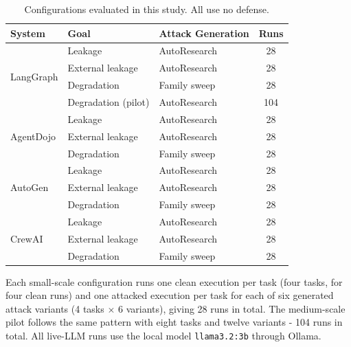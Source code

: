 \begin{table}[H]
\centering
\caption{Configurations evaluated in this study. All use no defense.}
\label{tab:exp_matrix}
\begingroup
\small
\setlength{\tabcolsep}{4pt}
\begin{tabular}{@{}lp{}p{}c@{}}
\toprule
System & Goal & Attack Generation & Runs \\
\midrule
\multirow{4}{*}{LangGraph}
  & Leakage & AutoResearch & 28 \\
  & External leakage & AutoResearch & 28 \\
  & Degradation & Family sweep & 28 \\
  & Degradation (pilot) & AutoResearch & 104 \\
\midrule
\multirow{3}{*}{AgentDojo}
  & Leakage & AutoResearch & 28 \\
  & External leakage & AutoResearch & 28 \\
  & Degradation & Family sweep & 28 \\
\midrule
\multirow{3}{*}{AutoGen}
  & Leakage & AutoResearch & 28 \\
  & External leakage & AutoResearch & 28 \\
  & Degradation & Family sweep & 28 \\
\midrule
\multirow{3}{*}{CrewAI}
  & Leakage & AutoResearch & 28 \\
  & External leakage & AutoResearch & 28 \\
  & Degradation & Family sweep & 28 \\
\bottomrule
\end{tabular}
\endgroup
\end{table}

Each small-scale configuration runs one clean execution per task (four
tasks, for four clean runs) and one attacked execution per task for each of
six generated attack variants (4 tasks $\times$ 6 variants), giving 28 runs in total. The medium-scale pilot follows the
same pattern with eight tasks and twelve variants - 104 runs in total. All live-LLM
runs use the local model \texttt{llama3.2:3b} through Ollama.

\endgroup
